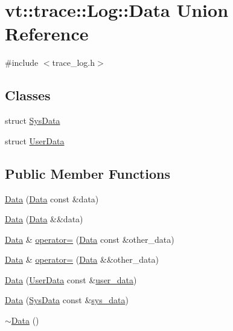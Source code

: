 \hypertarget{unionvt_1_1trace_1_1_log_1_1_data}{}\section{vt\+:\+:trace\+:\+:Log\+:\+:Data Union Reference}
\label{unionvt_1_1trace_1_1_log_1_1_data}


{\ttfamily \#include $<$trace\+\_\+log.\+h$>$}

\subsection*{Classes}
\begin{DoxyCompactItemize}
\item 
struct \hyperlink{structvt_1_1trace_1_1_log_1_1_data_1_1_sys_data}{Sys\+Data}
\item 
struct \hyperlink{structvt_1_1trace_1_1_log_1_1_data_1_1_user_data}{User\+Data}
\end{DoxyCompactItemize}
\subsection*{Public Member Functions}
\begin{DoxyCompactItemize}
\item 
\hyperlink{unionvt_1_1trace_1_1_log_1_1_data_a8361a2cf0feb1a5c238766ce0608d8c2}{Data} (\hyperlink{unionvt_1_1trace_1_1_log_1_1_data}{Data} const \&data)
\item 
\hyperlink{unionvt_1_1trace_1_1_log_1_1_data_ad53002e880d4c931f76c62485e2d798a}{Data} (\hyperlink{unionvt_1_1trace_1_1_log_1_1_data}{Data} \&\&data)
\item 
\hyperlink{unionvt_1_1trace_1_1_log_1_1_data}{Data} \& \hyperlink{unionvt_1_1trace_1_1_log_1_1_data_a9a3cab1f1e1983d77f9a7766aa464cf6}{operator=} (\hyperlink{unionvt_1_1trace_1_1_log_1_1_data}{Data} const \&other\+\_\+data)
\item 
\hyperlink{unionvt_1_1trace_1_1_log_1_1_data}{Data} \& \hyperlink{unionvt_1_1trace_1_1_log_1_1_data_a6f90113c26e6b4c60ce2159dab367356}{operator=} (\hyperlink{unionvt_1_1trace_1_1_log_1_1_data}{Data} \&\&other\+\_\+data)
\item 
\hyperlink{unionvt_1_1trace_1_1_log_1_1_data_aa76f0f5895f20a4b607e2666b2ad944e}{Data} (\hyperlink{structvt_1_1trace_1_1_log_1_1_data_1_1_user_data}{User\+Data} const \&\hyperlink{structvt_1_1trace_1_1_log_a7b251bc7dcebcbbafa29cc2ca6ea4c12}{user\+\_\+data})
\item 
\hyperlink{unionvt_1_1trace_1_1_log_1_1_data_ae94b837f6aa6d25ad87df4b05f089ed9}{Data} (\hyperlink{structvt_1_1trace_1_1_log_1_1_data_1_1_sys_data}{Sys\+Data} const \&\hyperlink{structvt_1_1trace_1_1_log_a082937c397ac5b47ffc9089ff94698f0}{sys\+\_\+data})
\item 
\hyperlink{unionvt_1_1trace_1_1_log_1_1_data_a756ed898d9a1df126b2e214050f158e1}{$\sim$\+Data} ()
\end{DoxyCompactItemize}
